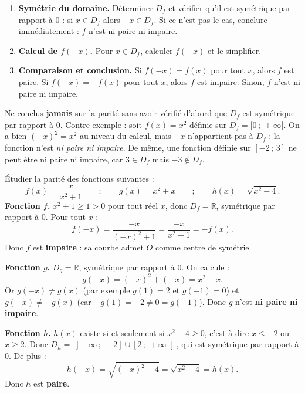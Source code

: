 \documentclass[11pt]{article}
\newcounter{popsec}
\newcounter{popsub}
\newcommand{\courssub}[1]{%
  \stepcounter{popsub}%
  \par\vspace{9pt}\noindent{\popxbold\fontsize{11.5}{13}\selectfont\color{popink}{\color{poporange}\thepopsec.\thepopsub}\hspace{6pt}#1}\par\nopagebreak\vspace{4pt}
}
\begin{document}
\courssub{Méthode d'étude de la parité}

\begin{methode}
\begin{enumerate}
\item \textbf{Symétrie du domaine.} Déterminer $D_f$ et vérifier qu'il est symétrique par rapport à $0$ : si $x \in D_f$ alors $-x \in D_f$. Si ce n'est pas le cas, conclure immédiatement : $f$ n'est ni paire ni impaire.
\item \textbf{Calcul de $f(-x)$.} Pour $x \in D_f$, calculer $f(-x)$ et le simplifier.
\item \textbf{Comparaison et conclusion.} Si $f(-x) = f(x)$ pour tout $x$, alors $f$ est paire. Si $f(-x) = -f(x)$ pour tout $x$, alors $f$ est impaire. Sinon, $f$ n'est ni paire ni impaire.
\end{enumerate}
\end{methode}

\begin{attention}
Ne conclus \textbf{jamais} sur la parité sans avoir vérifié d'abord que $D_f$ est symétrique par rapport à $0$. Contre-exemple : soit $f(x) = x^2$ définie sur $D_f = [0\,;\,+\infty[$. On a bien $(-x)^2 = x^2$ au niveau du calcul, mais $-x$ n'appartient pas à $D_f$ : la fonction n'est \emph{ni paire ni impaire}. De même, une fonction définie sur $[-2\,;\,3]$ ne peut être ni paire ni impaire, car $3 \in D_f$ mais $-3 \notin D_f$.
\end{attention}

\begin{exoresolu}
Étudier la parité des fonctions suivantes :
\[
f(x) = \frac{x}{x^2 + 1} \qquad ; \qquad g(x) = x^2 + x \qquad ; \qquad h(x) = \sqrt{x^2 - 4}.
\]
\tcblower
\textbf{Fonction $f$.} $x^2 + 1 \geq 1 > 0$ pour tout réel $x$, donc $D_f = \mathbb{R}$, symétrique par rapport à $0$. Pour tout $x$ :
\[
f(-x) = \frac{-x}{(-x)^2 + 1} = \frac{-x}{x^2 + 1} = -f(x).
\]
Donc $f$ est \textbf{impaire} : sa courbe admet $O$ comme centre de symétrie.

\textbf{Fonction $g$.} $D_g = \mathbb{R}$, symétrique par rapport à $0$. On calcule :
\[
g(-x) = (-x)^2 + (-x) = x^2 - x.
\]
Or $g(-x) \neq g(x)$ (par exemple $g(1) = 2$ et $g(-1) = 0$) et $g(-x) \neq -g(x)$ (car $-g(1) = -2 \neq 0 = g(-1)$). Donc $g$ n'est \textbf{ni paire ni impaire}.

\textbf{Fonction $h$.} $h(x)$ existe si et seulement si $x^2 - 4 \geq 0$, c'est-à-dire $x \leq -2$ ou $x \geq 2$. Donc $D_h = \left]-\infty\,;\,-2\right] \cup \left[2\,;\,+\infty\right[$, qui est symétrique par rapport à $0$. De plus :
\[
h(-x) = \sqrt{(-x)^2 - 4} = \sqrt{x^2 - 4} = h(x).
\]
Donc $h$ est \textbf{paire}.
\end{exoresolu}
\end{document}
